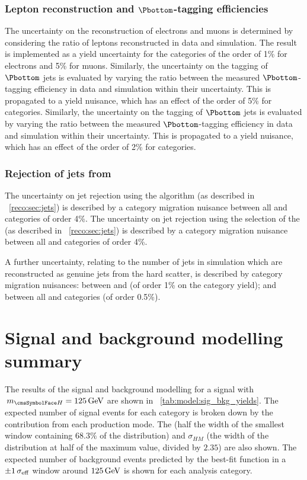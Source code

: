 \subsubsection{Lepton reconstruction and $\Pbottom$-tagging efficiencies}
The uncertainty on the reconstruction of electrons and muons is determined by considering the ratio of leptons reconstructed in data and simulation. The result is implemented as a yield uncertainty for the \TTHTag categories of the order of 1\% for electrons and 5\% for muons.
\ifNewAnalysis
Similarly, the uncertainty on the tagging of $\Pbottom$ jets is evaluated by varying the ratio between the measured $\Pbottom$-tagging efficiency in data and simulation within their uncertainty. This is propagated to a yield nuisance, which has an effect of the order of 5\% for \TTHTag categories.
\else
Similarly, the uncertainty on the tagging of $\Pbottom$ jets is evaluated by varying the ratio between the measured $\Pbottom$-tagging efficiency in data and simulation within their uncertainty. This is propagated to a yield nuisance, which has an effect of the order of 2\% for \TTHTag categories.
\fi

\subsubsection{Rejection of jets from \PU}
\ifNewAnalysis
The uncertainty on \PU jet rejection using the \PUJID algorithm (as described in \Sec~\ref{reco:sec:jets}) is described by a category migration nuisance between all \VBF and \Untagged categories of order 4\%.
\else
The uncertainty on \PU jet rejection using the selection of the \RMS (as described in \Sec~\ref{reco:sec:jets}) is described by a category migration nuisance between all \VBF and \Untagged categories of order 4\%.
\fi

A further uncertainty, relating to the number of \PU jets in simulation which are reconstructed as genuine jets from the hard scatter, is described by category migration nuisances: between  and  (of order 1\% on the category yield); and between all \VBF and \Untagged categories (of order 0.5\%).

\section{Signal and background modelling summary}

The results of the signal and background modelling for a signal with $\mH=125\GeV$ are shown in \Table~\ref{tab:model:sig_bkg_yields}. The expected number of signal events for each category is broken down by the contribution from each production mode. The \effSigma (half the width of the smallest window containing $68.3\%$ of the distribution) and $\sigma_{HM}$ (the width of the distribution at half of the maximum value, divided by $2.35$) are also shown. The expected number of background events predicted by the best-fit function in a $\pm 1 \,\sigma_{\text{eff}}$ window around $125\,\text{Ge\hspace{-.08em}V}$ is shown for each analysis category. 

